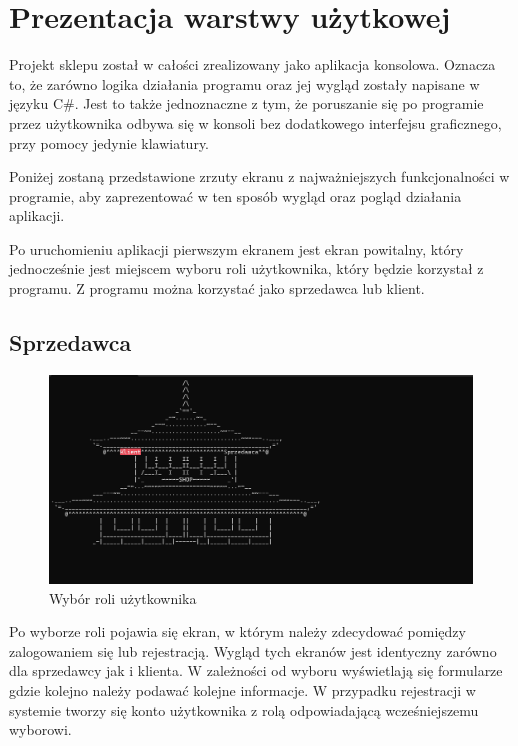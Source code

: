 ﻿\chapter{Prezentacja warstwy użytkowej}
Projekt sklepu został w całości zrealizowany jako aplikacja konsolowa. Oznacza to, że zarówno logika działania programu oraz jej wygląd zostały napisane w języku C\#. Jest to także jednoznaczne z tym, że poruszanie się po programie przez użytkownika odbywa się w konsoli bez dodatkowego interfejsu graficznego, przy pomocy jedynie klawiatury.\newline

Poniżej zostaną przedstawione zrzuty ekranu z najważniejszych funkcjonalności w programie, aby zaprezentować w ten sposób wygląd oraz pogląd działania aplikacji.\newline

Po uruchomieniu aplikacji pierwszym ekranem jest ekran powitalny, który jednocześnie jest miejscem wyboru roli użytkownika, który będzie korzystał z programu. Z programu można korzystać jako sprzedawca lub klient.\newline

\section{Sprzedawca}

\begin{figure}[H]
	\centering
		\includegraphics[width=15cm]{screeny/ekran_start.png}
	\caption{\footnotesize Wybór roli użytkownika}
	\label{fig:plotend}
\end{figure}

Po wyborze roli pojawia się ekran, w którym należy zdecydować pomiędzy zalogowaniem się lub rejestracją. Wygląd tych ekranów jest identyczny zarówno dla sprzedawcy jak i klienta. W zależności od wyboru wyświetlają się formularze gdzie kolejno należy podawać kolejne informacje. W przypadku rejestracji w systemie tworzy się konto użytkownika z rolą odpowiadającą wcześniejszemu wyborowi.

